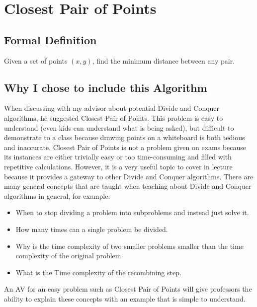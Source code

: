 \section{Closest Pair of Points}
%
\subsection{Formal Definition}
\hspace{-0.26in}
Given a set of points $(x, y)$, find the minimum distance between any pair. 
%
\subsection{Why I chose to include this Algorithm}
\hspace{-0.26in}
When discussing with my advisor about potential Divide and Conquer algorithms, 
he suggested Closest Pair of Points. 
This problem is easy to understand (even kids can understand what is being asked),
but difficult to demonstrate to a class because
drawing points on a whiteboard is both tedious and inaccurate.
\newline\newline
Closest Pair of Points is not a problem given on exams 
because its instances are either trivially easy or too time-consuming and filled with
repetitive calculations. However, it is a very useful topic to cover in lecture 
because it provides a gateway to other Divide and Conquer algorithms. 
There are many general concepts that are taught when teaching about
Divide and Conquer algorithms in general, for example: 
\begin{itemize}
	\item When to stop dividing a problem into subproblems and instead just solve it.
	\item How many times can a single problem be divided.
	\item Why is the time complexity of two smaller problems smaller 
		than the time complexity of the original problem.
	\item What is the Time complexity of the recombining step.
\end{itemize}
An AV for an easy problem such as Closest Pair of Points 
will give professors the ability to 
explain these concepts with an example that is simple to understand.
%
